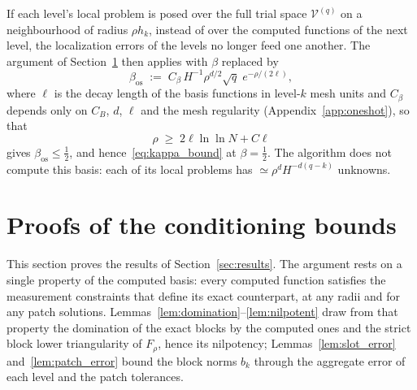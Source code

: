 \documentclass[hidelinks]{siamart}
\theoremstyle{nonumberplain}
\numberwithin{theorem}{section}
\begin{document}
\begin{remark}\label{rem:oneshot}
If each level's local problem is posed over the full trial space
$\mathcal{V}^{(q)}$ on a neighbourhood of radius $\rho h_k$, instead of
over the computed functions of the next level, the localization errors
of the levels no longer feed one another.  The argument of
Section~\ref{sec:preconditioner} then applies with $\beta$ replaced by
\begin{equation}\label{eq:beta}
  \beta_{\mathrm{os}} \;:=\; C_\beta\, H^{-1} \rho^{d/2} \sqrt{q}\;
    e^{-\rho/(2\ell)} ,
\end{equation}
where $\ell$ is the decay length of the basis functions in level-$k$
mesh units \cite[Thm.~15.41]{Owhadi_Scovel_2019} and $C_\beta$ depends
only on $C_B$, $d$, $\ell$ and the mesh regularity
(Appendix~\ref{app:oneshot}), so that
\begin{equation}\label{eq:rho_iter}
  \rho \;\geq\; 2\ell\ln\ln N + C\ell
\end{equation}
gives $\beta_{\mathrm{os}} \leq \tfrac12$, and
hence~\eqref{eq:kappa_bound} at $\beta = \tfrac12$.  The algorithm does
not compute this basis: each of its local problems has
$\simeq \rho^d H^{-d(q-k)}$ unknowns.
\end{remark}
\section{Proofs of the conditioning bounds}
\label{sec:preconditioner}
\label{sec:proof_conditioning}

This section proves the results of Section~\ref{sec:results}.  The
argument rests on a single property of the computed basis: every
computed function satisfies the measurement constraints that define its
exact counterpart, at any radii and for any patch solutions.
Lemmas~\ref{lem:domination}--\ref{lem:nilpotent} draw from that property
the domination of the exact blocks by the computed ones and the strict
block lower triangularity of $F_\rho$, hence its nilpotency;
Lemmas~\ref{lem:slot_error} and~\ref{lem:patch_error} bound the block
norms $b_k$ through the aggregate error of each level and the patch
tolerances.
\end{document}
